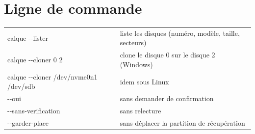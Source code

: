 \section{Ligne de commande}

\begin{tabular}{>{\ttfamily}l l}
calque -{}-lister & liste les disques (numéro, modèle, taille, secteurs) \\
calque -{}-cloner 0 2 & clone le disque 0 sur le disque 2 (Windows) \\
calque -{}-cloner /dev/nvme0n1 /dev/sdb & idem sous Linux \\
\quad -{}-oui & sans demander de confirmation \\
\quad -{}-sans-verification & sans relecture \\
\quad -{}-garder-place & sans déplacer la partition de récupération \\
\end{tabular}


